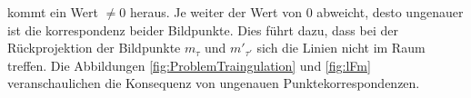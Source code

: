 kommt ein Wert $\neq 0$ heraus. Je weiter der Wert von 0 abweicht, desto ungenauer ist die korrespondenz beider Bildpunkte. Dies führt dazu, dass bei der Rückprojektion der Bildpunkte $m_\tau$ und $m'_{\tau'}$ sich die Linien nicht im Raum treffen. Die Abbildungen \ref{fig:ProblemTraingulation} und \ref{fig:lFm} veranschaulichen die Konsequenz von ungenauen Punktekorrespondenzen.
%
%
%
%

